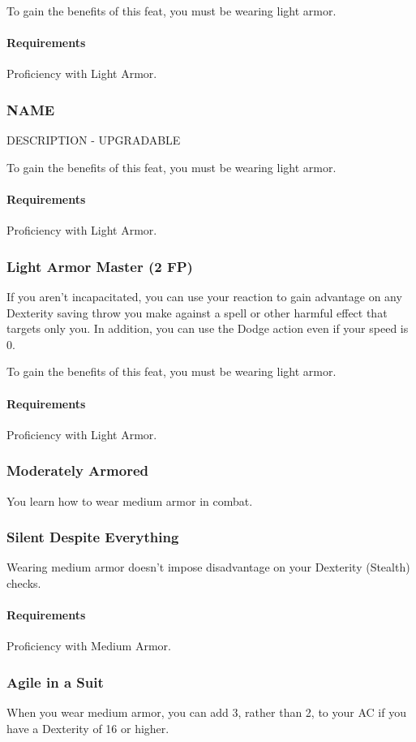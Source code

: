     To gain the benefits of this feat, you must be wearing light armor.
    \paragraph{Requirements} Proficiency with Light Armor.
\subsubsection{NAME} \label{feat::name}
    DESCRIPTION - UPGRADABLE

    To gain the benefits of this feat, you must be wearing light armor.
    \paragraph{Requirements} Proficiency with Light Armor.
\subsubsection{Light Armor Master (2 FP)} \label{feat::lightarmormaster}
    If you aren't incapacitated, you can use your reaction to gain advantage on any Dexterity saving throw you make against a spell or other harmful effect that targets only you.
    In addition, you can use the Dodge action even if your speed is 0.

    To gain the benefits of this feat, you must be wearing light armor.
    \paragraph{Requirements} Proficiency with Light Armor.
\subsubsection{Moderately Armored} \label{feat::moderatelyarmored}
    You learn how to wear medium armor in combat.
\subsubsection{Silent Despite Everything} \label{feat::silentdespiteeverything}
    Wearing medium armor doesn't impose disadvantage on your Dexterity (Stealth) checks.
    \paragraph{Requirements} Proficiency with Medium Armor.
\subsubsection{Agile in a Suit} \label{feat::agileinasuit}
    When you wear medium armor, you can add 3, rather than 2, to your AC if you have a Dexterity of 16 or higher.
